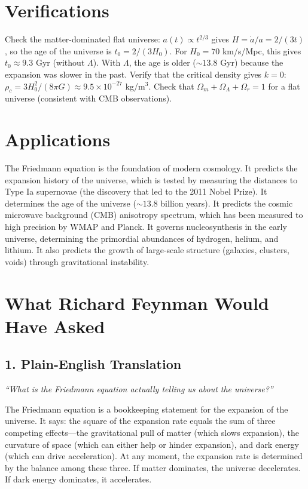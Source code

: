 \documentclass[11pt,openright]{book}
\begin{document}
\section*{Verifications}

Check the matter-dominated flat universe: $a(t) \propto t^{2/3}$ gives $H = \dot{a}/a = 2/(3t)$, so the age of the universe is $t_0 = 2/(3H_0)$. For $H_0 = 70$ km/s/Mpc, this gives $t_0 \approx 9.3$ Gyr (without $\Lambda$). With $\Lambda$, the age is older ($\sim 13.8$ Gyr) because the expansion was slower in the past. Verify that the critical density gives $k = 0$: $\rho_c = 3H_0^2/(8\pi G) \approx 9.5 \times 10^{-27}$ kg/m$^3$. Check that $\Omega_m + \Omega_\Lambda + \Omega_r = 1$ for a flat universe (consistent with CMB observations).
\section*{Applications}

The Friedmann equation is the foundation of modern cosmology. It predicts the expansion history of the universe, which is tested by measuring the distances to Type Ia supernovae (the discovery that led to the 2011 Nobel Prize). It determines the age of the universe ($\sim 13.8$ billion years). It predicts the cosmic microwave background (CMB) anisotropy spectrum, which has been measured to high precision by WMAP and Planck. It governs nucleosynthesis in the early universe, determining the primordial abundances of hydrogen, helium, and lithium. It also predicts the growth of large-scale structure (galaxies, clusters, voids) through gravitational instability.
\section*{What Richard Feynman Would Have Asked}

\subsection*{1. Plain-English Translation}
\textit{``What is the Friedmann equation actually telling us about the universe?''}

The Friedmann equation is a bookkeeping statement for the expansion of the universe. It says: the square of the expansion rate equals the sum of three competing effects---the gravitational pull of matter (which slows expansion), the curvature of space (which can either help or hinder expansion), and dark energy (which can drive acceleration). At any moment, the expansion rate is determined by the balance among these three. If matter dominates, the universe decelerates. If dark energy dominates, it accelerates.
\end{document}
